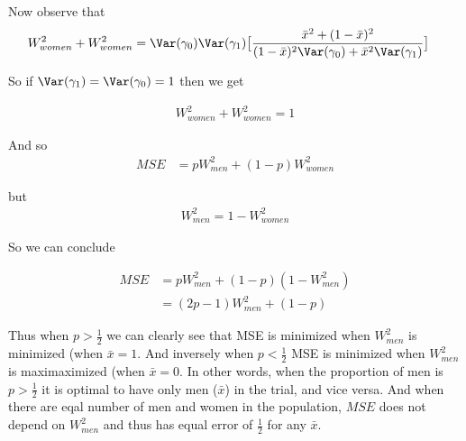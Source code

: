 Now observe that
\begin{align*}
	W_{women}^2 + W_{women}^2 &= \Var(\gamma_0) \Var(\gamma_1) \big[ \frac{\bar{x}^2 + (1- \bar{x})^2}{(1-\bar{x})^2 \Var(\gamma_0) + \bar{x}^2 \Var(\gamma_1)} \big]
\end{align*} 

So if $\Var(\gamma_1) = \Var(\gamma_0) = 1$ then we get

\begin{align*}
	W_{women}^2 + W_{women}^2 = 1	
\end{align*} 

And so 
\begin{align*}
	MSE &= p W^2_{men} + (1 - p) W^2_{women}
\end{align*} 

but
\begin{align*}
	W^{2}_{men} = 1 - W^{2}_{women}
\end{align*} 

So we can conclude

\begin{align*}
	MSE &= p W^{2}_{men} + (1-p) (1 - W^{2}_{men}) \\
	&= (2p-1) W^{2}_{men} + (1-p) 
\end{align*} 

Thus when $p > \frac{1}{2}$ we can clearly see that MSE is minimized when $W_{men}^2$ is minimized (when $\bar{x} = 1$. And inversely when $p < \frac{1}{2}$ MSE is minimized when $W_{men}^2$ is maximaximized (when $\bar{x} = 0$. In other words, when the proportion of men is  $p > \frac{1}{2}$ it is optimal to have only men ($\bar{x}$) in the trial, and vice versa. And when there are eqal number of men and women in the population,  $MSE$ does not depend on $W_{men}^2$ and thus has equal error of $ \frac{1}{2}$ for any $\bar{x}$.



